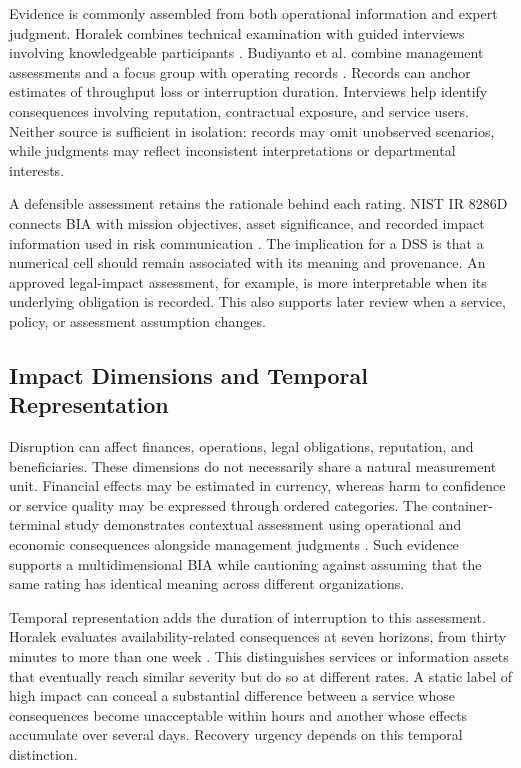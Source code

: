 Evidence is commonly assembled from both operational information and expert judgment. Horalek combines technical examination with guided interviews involving knowledgeable participants \cite{amm2023bia}. Budiyanto et al. combine management assessments and a focus group with operating records \cite{container2021bia}. Records can anchor estimates of throughput loss or interruption duration. Interviews help identify consequences involving reputation, contractual exposure, and service users. Neither source is sufficient in isolation: records may omit unobserved scenarios, while judgments may reflect inconsistent interpretations or departmental interests.

A defensible assessment retains the rationale behind each rating. NIST IR 8286D connects BIA with mission objectives, asset significance, and recorded impact information used in risk communication \cite{quinn2025bia}. The implication for a DSS is that a numerical cell should remain associated with its meaning and provenance. An approved legal-impact assessment, for example, is more interpretable when its underlying obligation is recorded. This also supports later review when a service, policy, or assessment assumption changes.

\subsection{Impact Dimensions and Temporal Representation}
\label{sec:lr_time_impact}

Disruption can affect finances, operations, legal obligations, reputation, and beneficiaries. These dimensions do not necessarily share a natural measurement unit. Financial effects may be estimated in currency, whereas harm to confidence or service quality may be expressed through ordered categories. The container-terminal study demonstrates contextual assessment using operational and economic consequences alongside management judgments \cite{container2021bia}. Such evidence supports a multidimensional BIA while cautioning against assuming that the same rating has identical meaning across different organizations.

Temporal representation adds the duration of interruption to this assessment. Horalek evaluates availability-related consequences at seven horizons, from thirty minutes to more than one week \cite{amm2023bia}. This distinguishes services or information assets that eventually reach similar severity but do so at different rates. A static label of high impact can conceal a substantial difference between a service whose consequences become unacceptable within hours and another whose effects accumulate over several days. Recovery urgency depends on this temporal distinction.

